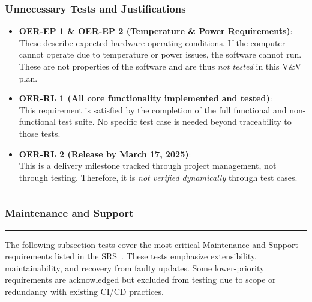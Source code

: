 \documentclass[12pt, titlepage]{article}
\newcommand{\colorrule}{\textcolor{BlueViolet}{\rule{\linewidth}{2pt}}}
\begin{document}
\subsubsection*{Unnecessary Tests and Justifications}

\begin{itemize}
  \item \textbf{OER-EP 1 \& OER-EP 2 (Temperature \& Power Requirements)}: \\
  These describe expected hardware operating conditions. If the computer cannot operate due to temperature or power issues, the software cannot run. These are not properties of the software and are thus \textit{not tested} in this V\&V plan.

  \item \textbf{OER-RL 1 (All core functionality implemented and tested)}: \\
  This requirement is satisfied by the completion of the full functional and non-functional test suite. No specific test case is needed beyond traceability to those tests.

  \item \textbf{OER-RL 2 (Release by March 17, 2025)}: \\
  This is a delivery milestone tracked through project management, not through testing. Therefore, it is \textit{not verified dynamically} through test cases.
\end{itemize}

  \noindent
  \colorrule

\subsubsection{Maintenance and Support}
\colorrule

\medskip

\noindent
The following subsection tests cover the most critical Maintenance and Support requirements listed in the SRS~\cite{SRS}. These tests emphasize extensibility, maintainability, and recovery from faulty updates. Some lower-priority requirements are acknowledged but excluded from testing due to scope or redundancy with existing CI/CD practices.
\end{document}

